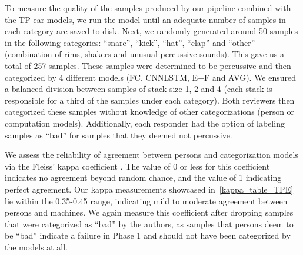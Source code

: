\documentclass[runningheads,a4paper]{llncs}
\begin{document}
\begin{table}[htbp]
\caption{\label{kappa_table_TPE}Table of Fleiss' kappa coefficient to measure the degree of agreement between persons (HvH), persons with FC model (H+FC), persons with CNNLSTM model, persons with all models (H+ALL), and between the 3 models. \enquote{Drop Rule} column indicates if any samples were dropped. We show the measurements after dropping samples if they are deemed bad by either or both responders. We also show measurements after dropping the \enquote{other} category along with samples deemed bad by either responder. }
\end{table}
To measure the quality of the samples produced by our pipeline combined with the TP ear models, we run the model until an adequate number of samples in each category are saved to disk. Next, we randomly generated around 50 samples in the following categories: \enquote{snare}, \enquote{kick}, \enquote{hat}, \enquote{clap} and \enquote{other} (combination of rims, 
shakers and unusual percussive sounds). This gave us a total of 257 samples. These samples were determined to be percussive and then categorized by 4 different models (FC, CNNLSTM, E+F and AVG). We ensured a balanced division between samples of stack size 1, 2 and 4 (each stack is responsible for a third of the samples under each category). Both reviewers then categorized these samples without knowledge of other categorizations (person or computation models). Additionally, each responder had the option of labeling samples as \enquote{bad} for samples that they deemed not percussive. 

We assess the reliability of agreement between persons and categorization models via the Fleiss' kappa coefficient \cite{fleiss1971measuring}. The value of 0 or less for this coefficient indicates no agreement beyond random chance, and the value of 1 indicating perfect agreement. Our kappa measurements showcased in~\ref{kappa_table_TPE} lie within the 0.35-0.45 range, indicating mild to moderate agreement between persons and machines. We again measure this coefficient after dropping samples that were categorized as \enquote{bad} by the authors, as samples that persons deem to be \enquote{bad} indicate a failure in Phase 1 and should not have been categorized by the models at all.
\end{document}
